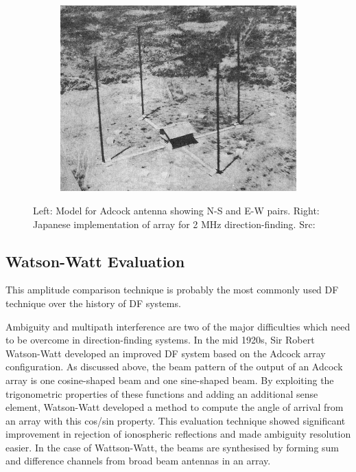\begin{figure}
\begin{subfigure}[b]{0.6\textwidth}
    \includegraphics[width=\textwidth]{./img/lit_review/adcock_implementation}
  \end{subfigure}
  \caption{Left: Model for Adcock antenna showing N-S and E-W pairs. Right: Japanese implementation of array for 2 MHz direction-finding. Src: \cite{japanesecommunications}}
  \label{fig:lit_adcock_array}
\end{figure}


\subsection{Watson-Watt Evaluation}
This amplitude comparison technique is probably the most commonly used DF technique over the history of DF systems\cite{poisel2012electronic}.

Ambiguity and multipath interference are two of the major difficulties which need to be overcome in direction-finding systems. 
In the mid 1920s, Sir Robert Watson-Watt developed an improved DF system based on the Adcock array configuration. 
As discussed above, the beam pattern of the output of an Adcock array is one cosine-shaped beam and one sine-shaped beam. By exploiting the trigonometric properties of these functions and adding an additional sense element, Watson-Watt developed a method to compute the angle of arrival from an array with this cos/sin property. 
This evaluation technique showed significant improvement in rejection of ionospheric reflections and made ambiguity resolution easier.
In the case of Wattson-Watt, the beams are synthesised by forming sum and difference channels from broad beam antennas in an array.

